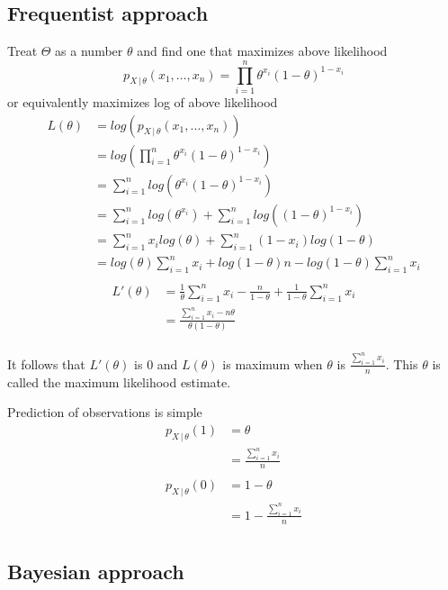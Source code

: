 \documentclass[14pt, reqno]{amsart}
\theoremstyle{definition}
\begin{document}
\subsection{Frequentist approach} Treat $\Theta$ as a number $\theta$ and find one that maximizes above likelihood
$$p_{X \,|\, \theta}(x_1, \dots, x_n) = \prod \limits _{i=1}^n \theta^{x_i} (1 - \theta)^{1 - x_i}$$
or equivalently maximizes log of above likelihood
\begin{align*}
L(\theta) & = log(p_{X \,|\, \theta}(x_1, \dots, x_n)) \\
& = log(\prod \limits _{i=1}^n \theta^{x_i} (1 - \theta)^{1 - x_i}) \\
& = \sum \limits _{i=1}^n log(\theta^{x_i} (1 - \theta)^{1 - x_i}) \\ & = \sum \limits _{i=1}^n log(\theta^{x_i}) + \sum \limits _{i=1}^n log((1 - \theta)^{1- x_i}) \\
& = \sum \limits _{i=1}^n x_i log(\theta) + \sum \limits _{i=1}^n (1- x_i) log(1 - \theta) \\
 & = log(\theta) \sum \limits _{i=1}^n x_i + log(1 - \theta) n - log(1 - \theta) \sum \limits _{i=1}^n x_i \\
\end{align*}
\begin{align*}
L'(\theta) & = \frac{1}{\theta} \sum \limits _{i=1}^n x_i - \frac{n}{1 - \theta} + \frac{1}{1 - \theta} \sum \limits _{i=1}^n x_i \\
 & = \frac{\sum \limits _{i=1}^n x_i - n \theta}{\theta(1 - \theta)} \\
\end{align*}

It follows that $L'(\theta)$ is $0$ and $L(\theta)$ is maximum when $\theta$ is $\frac{\sum \limits _{i=1}^n x_i}{n}$. This $\theta$ is called the maximum likelihood estimate.

Prediction of observations is simple
\begin{align*}
p_{X \,|\, \theta}(1) & = \theta \\
 & = \frac{\sum \limits _{i=1}^n x_i}{n} \\
\\
p_{X \,|\, \theta}(0) & = 1 - \theta \\
 & = 1 - \frac{\sum \limits _{i=1}^n x_i}{n}\\
\end{align*}

\subsection{Bayesian approach}
\end{document}
